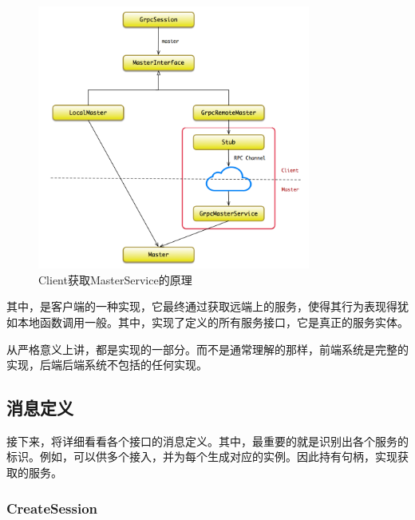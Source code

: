 \begin{content}
\begin{content}
\begin{figure}[H]
\centering
\includegraphics[width=0.8\textwidth]{figures/dist-client-master-interaction.png}
\caption{Client获取MasterService的原理}
 \label{fig:dist-client-master-interaction}
\end{figure}

其中，是客户端的一种实现，它最终通过获取远端上的服务，使得其行为表现得犹如本地函数调用一般。其中，实现了定义的所有服务接口，它是真正的服务实体。

\begin{remark}
从严格意义上讲，都是实现的一部分。而不是通常理解的那样，前端系统是完整的实现，后端后端系统不包括的任何实现。
\end{remark}

\subsection{消息定义}

接下来，将详细看看各个接口的消息定义。其中，最重要的就是识别出各个服务的标识。例如，可以供多个接入，并为每个生成对应的实例。因此持有句柄，实现获取的服务。

\subsubsection{CreateSession}


\end{content}
\end{content}
